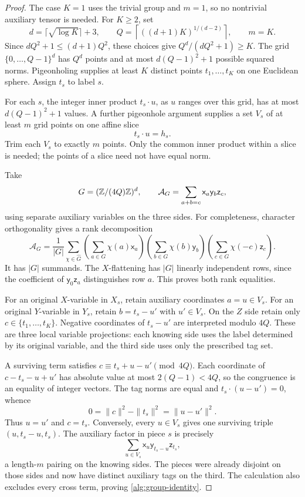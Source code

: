 \begin{proof}
The case \(K=1\) uses the trivial group and \(m=1\), so no
nontrivial auxiliary tensor is needed.
For \(K\geq2\), set
\[
 d=\lceil\sqrt{\log K}\rceil+3,
 \qquad
 Q=\left\lceil((d+1)K)^{1/(d-2)}\right\rceil,
 \qquad m=K.
\]
Since \(dQ^2+1\leq(d+1)Q^2\), these choices give
\(Q^d/(dQ^2+1)\geq K\).
The grid \(\{0,\ldots,Q-1\}^d\) has \(Q^d\) points and at most
\(d(Q-1)^2+1\) possible squared norms.  Pigeonholing supplies at least
\(K\) distinct points \(t_1,\ldots,t_K\) on one Euclidean sphere.
Assign \(t_s\) to label \(s\).

For each \(s\), the integer inner product \(t_s\cdot u\), as \(u\)
ranges over this grid, has at most \(d(Q-1)^2+1\) values.  A further
pigeonhole argument supplies a set \(V_s\) of at least \(m\) grid points
on one affine slice
\[
 t_s\cdot u=h_s.
\]
Trim each \(V_s\) to exactly \(m\) points.  Only the common inner product
within a slice is needed; the points of a slice need not have equal norm.

Take
\[
 G=(\mathbb Z/(4Q)\mathbb Z)^d,
 \qquad
 \mathcal A_G=\sum_{a+b=c}\mathsf{x}_a\mathsf{y}_b\mathsf{z}_c,
\]
using separate auxiliary variables on the three sides.  For completeness,
character orthogonality gives a rank decomposition
\[
 \mathcal A_G=\frac1{|G|}\sum_{\chi\in\widehat G}
 \left(\sum_{a\in G}\chi(a)\mathsf{x}_a\right)
 \left(\sum_{b\in G}\chi(b)\mathsf{y}_b\right)
 \left(\sum_{c\in G}\chi(-c)\mathsf{z}_c\right).
\]
It has \(|G|\) summands.  The \(X\)-flattening has \(|G|\) linearly
independent rows, since the coefficient of
\(\mathsf{y}_0\mathsf{z}_a\) distinguishes row
\(a\).  This proves both rank equalities.

For an original \(X\)-variable in \(X_s\), retain auxiliary coordinates
\(a=u\in V_s\).  For an original \(Y\)-variable in \(Y_s\), retain
\(b=t_s-u'\) with \(u'\in V_s\).  On the \(Z\) side retain only
\(c\in\{t_1,\ldots,t_K\}\).  Negative coordinates of \(t_s-u'\)
are interpreted modulo \(4Q\).  These are three local variable
projections: each knowing side uses the label determined by its original
variable, and the third side uses only the prescribed tag set.

A surviving term satisfies
\(c\equiv t_s+u-u'\pmod{4Q}\).
Each coordinate of \(c-t_s-u+u'\) has absolute value at most
\(2(Q-1)<4Q\), so the congruence is an equality of integer vectors.
The tag norms are equal and
\(t_s\cdot(u-u')=0\), whence
\[
 0=\|c\|^2-\|t_s\|^2=\|u-u'\|^2.
\]
Thus \(u=u'\) and \(c=t_s\).  Conversely, every \(u\in V_s\) gives
one surviving triple \((u,t_s-u,t_s)\).
The auxiliary factor in piece \(s\) is precisely
\[
 \sum_{u\in V_s}\mathsf{x}_u\mathsf{y}_{t_s-u}\mathsf{z}_{t_s},
\]
a length-\(m\) pairing on the knowing sides.  The pieces were already
disjoint on those sides and now have distinct auxiliary tags on the third.
The calculation also excludes every cross term, proving
\eqref{alg:group-identity}.


\end{proof}

